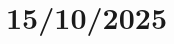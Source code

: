 \documentclass[a4paper]{article}
\begin{document}




\pagebreak

\section{15/10/2025}
\end{document}
